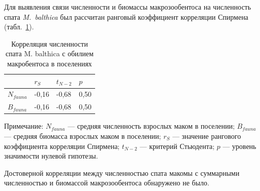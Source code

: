 Для выявления связи численности и биомассы макрозообентоса на численность спата {\it M.~balthica} был рассчитан ранговый коэффициент корреляции Спирмена (табл.~\ref{spat_fauna_correlation}). 
\begin{table}[p]
\caption{Корреляция численности спата M. balthica с обилием макробентоса в поселениях}
\label{spat_fauna_correlation}
\begin{center}
\begin{tabular}{|l|lll|}
\hline
     & $r_S$    & $t_{N-2}$   & $p$    \\ \hline
$N_{fauna}$  & -0,16 & -0,68 & 0,50 \\
$B_{fauna}$  & -0,16 & -0,68 & 0,50\\
\hline
\end{tabular}
\end{center}

\footnotesize{Примечание: $N_{fauna}$ --- средняя численность взрослых маком в поселении; 
$B_{fauna}$ --- средняя биомасса взрослых маком в поселении; 
$r_S$ --- значение рангового коэффициента корреляции Спирмена; 
$t_{N-2}$ --- критерий Стьюдента;   
$p$ --- уровень значимости нулевой гипотезы.}
\end{table}
Достоверной корреляции между численностью спата макомы с суммарными численностью и биомассой макрозообентоса обнаружено не было.

\afterpage{\clearpage}
